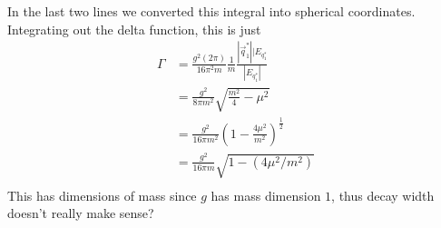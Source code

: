  In the last two lines we converted this integral into spherical 
 coordinates. 
 Integrating out the delta function, this is just 
 \begin{align*} 
	 \Gamma & = \frac{g ^ 2 ( 2 \pi ) }{ 16 \pi ^2 m} \frac{1}{m } \frac{ |\vec{q} _ 1 ^ * | | E_{ q_ 1 ^ * }}{
	 | E_{ q_ 1 ^ * } | } \\ 
	 &=  \frac{ g ^ 2 }{ 8 \pi m ^ 2 } \sqrt{ \frac{m ^ 2 }{ 4 }  - \mu ^ 2 }   \\ 
	 &=  \frac{g ^ 2 }{ 16 \pi m ^ 2 } \left(  1 -\frac{4 \mu ^ 2 }{ m ^ 2 }  \right)^{ \frac{1}{2 } }  \\
	 &=  \frac{g ^ 2 }{ 16 \pi m } \sqrt{ 1 - ( 4 \mu ^ 2 / m ^ 2 ) }  \\
 \end{align*} 
 This has dimensions of mass since $ g  $ has mass dimension $ 1 $, thus 
 decay width doesn't really make sense?
\pagebreak 

